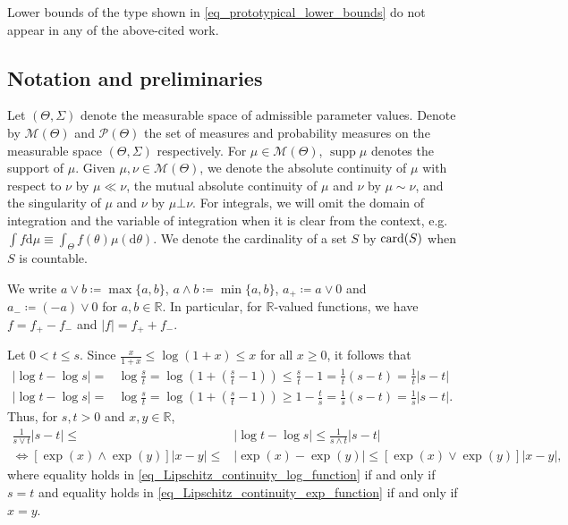 \documentclass[a4paper]{scrartcl}
\theoremstyle{definition}
\numberwithin{equation}{section}
\newcommand{\R}{\mathbb{R}}
\newcommand{\rd}{\mathrm{d}}
\newcommand{\card}[1]{\textup{card}({#1})}
\DeclareMathOperator{\supp}{supp}
\newcommand{\abs}[1]{\vert #1\vert}
\begin{document}
Lower bounds of the type shown in \eqref{eq_prototypical_lower_bounds} do not appear in any of the above-cited work.

\subsection{Notation and preliminaries}
\label{sec_notation}
Let $(\Theta,\Sigma)$ denote the measurable space of admissible parameter values. Denote by $\mathcal{M}(\Theta)$ and $\mathcal{P}(\Theta)$ the set of measures and probability measures on the measurable space $(\Theta,\Sigma)$ respectively. 
For $\mu\in\mathcal{M}(\Theta)$, $\supp{\mu}$ denotes the support of $\mu$.
Given $\mu,\nu\in\mathcal{M}(\Theta)$, we denote the absolute continuity of $\mu$ with respect to $\nu$ by $\mu\ll\nu$, the mutual absolute continuity of $\mu$ and $\nu$ by $\mu\sim\nu$, and the singularity of $\mu$ and $\nu$ by $\mu\bot \nu$.
For integrals, we will omit the domain of integration and the variable of integration when it is clear from the context, e.g. $\int f\rd \mu\equiv \int_{\Theta} f(\theta)\mu(\rd\theta)$.
We denote the cardinality of a set $S$ by $\card{S}$ when $S$ is countable.

We write $a\vee b\coloneqq \max\{a,b\}$, $a\wedge b\coloneqq \min\{a,b\}$, $a_+\coloneqq a \vee 0$ and $a_-\coloneqq (-a)\vee 0$ for $a,b\in\R$. In particular, for $\R$-valued functions, we have $f=f_+-f_-$ and $\abs{f}=f_++f_-$.

Let $0< t \leq s$. Since $\tfrac{x}{1+x}\leq \log{(1+x)} \leq x$ for all $x\geq 0$, it follows that
\begin{align*}
   \abs{\log t -\log s} =& \log \frac{s}{t} = \log \left(1+\left(\frac{s}{t}-1\right) \right) \leq \frac{s}{t} - 1 = \frac{1}{t}(s-t) = \frac{1}{t} \abs{ s-t}
   \\
      \abs{\log t -\log s} =& \log \frac{s}{t} = \log \left(1+\left(\frac{s}{t}-1\right) \right) \geq 1-\frac{t}{s} = \frac{1}{s}(s-t) = \frac{1}{s} \abs{ s-t}.
\end{align*}
Thus, for $s,t>0$ and $x,y\in\R$,
\begin{subequations}
\begin{align}
\label{eq_Lipschitz_continuity_log_function}
    \frac{1}{s\vee t} \abs{s- t}\leq& \abs {\log t -\log s}  \leq \frac{1}{s\wedge t} \abs{s- t}
    \\
    \label{eq_Lipschitz_continuity_exp_function}
    \Longleftrightarrow  [\exp(x)\wedge \exp(y)]\abs{x- y}\leq& \abs{\exp(x) -\exp(y)}  \leq [\exp(x)\vee \exp(y)]\abs{x- y},
\end{align}
\end{subequations}
where equality holds in \eqref{eq_Lipschitz_continuity_log_function} if and only if $s=t$ and equality holds in \eqref{eq_Lipschitz_continuity_exp_function} if and only if $x=y$.
\end{document}
